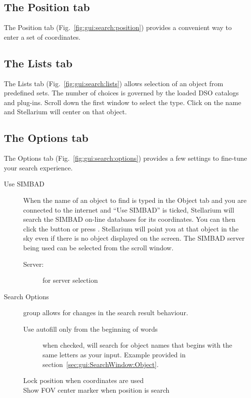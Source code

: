 \subsection{The Position tab}
\label{sec:gui:SearchWindow:Position}
The Position tab (Fig.~\ref{fig:gui:search:position}) provides a convenient way to enter a set
of coordinates.

\subsection{The Lists tab}
\label{sec:gui:SearchWindow:Lists}
The Lists tab (Fig.~\ref{fig:gui:search:lists}) allows selection of an object from predefined
sets.  The number of choices is governed by the loaded DSO catalogs and plug-ins. 
Scroll down the first window to select the type. Click on the name
and Stellarium will center on that object.

\subsection{The Options tab}
\label{sec:gui:SearchWindow:Options}
The Options tab (Fig.~\ref{fig:gui:search:options}) provides a few settings to fine-tune your search experience.

\begin{description}
\item[Use SIMBAD]
When the name of an object to find is typed in the Object
tab and you are connected to the internet and ``Use SIMBAD'' is
ticked, Stellarium will search the SIMBAD on-line databases for its
coordinates. You can then click the  button or press \key{\return}.
Stellarium will point you at that object in the sky even if there is no
object displayed on the screen. The SIMBAD server being used can be
selected from the scroll window.
\begin{description}
\item[Server:] for server selection
\end{description}
\end{description}

\begin{description}
\item[Search Options] group allows for changes in the search result behaviour.
\begin{description}
\item[Use autofill only from the beginning of words] when checked, will 
search for object names that begins with the same letters as your input. 
Example provided in section~\ref{sec:gui:SearchWindow:Object}. 
\item[Lock position when coordinates are used]
\item[Show FOV center marker when position is search]
\end{description}        
\end{description}

